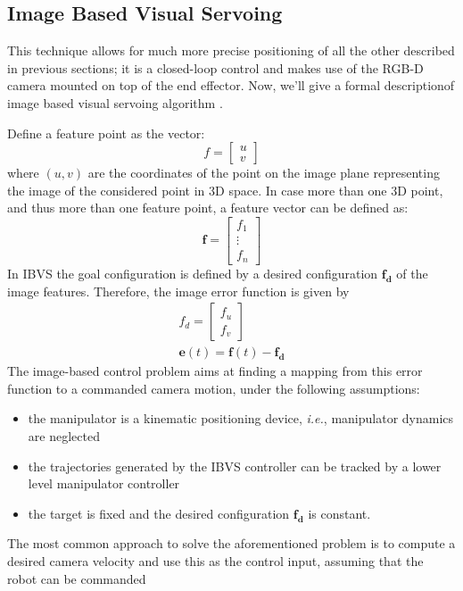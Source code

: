 \subsection{Image Based Visual Servoing}
This technique allows for much more precise positioning of all the other described in previous sections; it is a closed-loop control and makes use of the RGB-D camera mounted on top of the end effector. Now, we'll give a formal descriptionof image based visual servoing algorithm \parencite{imageBasedVisualServo}.
\par
Define a feature point as the vector: 
\[
f = \left[\begin{array}{c}u \\v\end{array}\right]
\]
where $(u,v)$ are the coordinates of the point on the image plane representing the image of the considered point in 3D space. In case more than one 3D point, and thus more than one feature point, a feature vector can be defined as:
\[
\boldsymbol{f} = \left[\begin{array}{c}f_1 \\ \vdots \\ f_n\end{array}\right]
\]
In IBVS the goal configuration is defined by a desired configuration $\boldsymbol{f_d}$ of the image features. Therefore, the image error function is given by
\begin{align*}
f_d=\left[\begin{array}{c} f_u \\ f_v \end{array}\right] \\
\boldsymbol{e}(t)=\boldsymbol{f}(t)-\boldsymbol{f_d}
\end{align*}
The image-based control problem aims at finding a mapping from this error function to a
commanded camera motion, under the following assumptions:
\begin{itemize}
	\item the manipulator is a kinematic positioning device, \textit{i.e.}, manipulator dynamics are neglected
	\item the trajectories generated by the IBVS controller can be tracked by a lower level
manipulator controller
	\item the target is fixed and the desired configuration $\boldsymbol{f_d}$ is constant.
\end{itemize}
The most common approach to solve the aforementioned problem is to compute a desired
camera velocity and use this as the control input, assuming that the robot can be commanded
